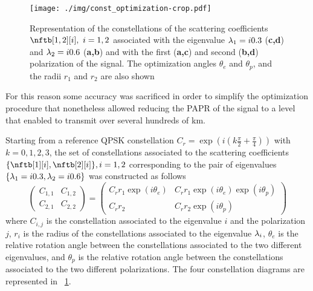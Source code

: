 \begin{figure}[t]
  \centering
  \texttt{[image: ./img/const\_optimization-crop.pdf]}

  \caption{Representation of
  the constellations of the scattering coefficients $\nftb[1,2][i],~i=1,2$ associated with the eigenvalue $\eig[1]=i 0.3$ (\textbf{c,d}) and $\eig[2] = i 0.6$ (\textbf{a,b}) and with the first (\textbf{a,c}) and second (\textbf{b,d}) polarization of the signal. The optimization angles $\theta_e$ and $\theta_p$, and the radii $r_1$ and $r_2$ are also shown}
  \label{fig:const_optimization-opt}
\end{figure}

For this reason some accuracy was sacrificed in order to simplify the optimization procedure that nonetheless allowed reducing the \ac{PAPR} of the signal to a level that enabled to transmit over several hundreds of \si{\km}.

Starting from a reference \ac{QPSK} constellation
$C_r = \exp \left( i \left( k \frac{\pi}{2} + \frac{\pi}{4}\right ) \right )$ with $k=0,1,2,3 $,
the set of constellations associated to the scattering
 coefficients $\{\nftb[1][i],\nftb[2][i]\},i=1,2$ corresponding to the pair of eigenvalues $\{\eig[1]=\iunit0.3, \eig[2]=\iunit0.6\}$ was constructed as follows
 \begin{equation}
 \begin{pmatrix}
 C_{1,1} & C_{1,2} \\
 C_{2,1} & C_{2,2}
 \end{pmatrix} =
 \begin{pmatrix}
 C_r r_1 \exp( i \theta_e ) & C_r r_1 \exp( i \theta_e ) \exp( i \theta_p ) \\
 C_r r_2  & C_r r_2  \exp( i \theta_p )
 \end{pmatrix}
\end{equation}
where $C_{i,j}$ is the constellation associated to the eigenvalue $i$ and the polarization $j$, $r_i$ is the radius of the constellations associated to the eigenvalue $\eig[i]$, $\theta_e$ is the relative rotation angle between the constellations associated to the two different eigenvalues, and $\theta_p$ is the relative rotation angle between the constellations associated to the two different polarizations. The four constellation diagrams are represented in \figurename~\ref{fig:const_optimization-opt}.

